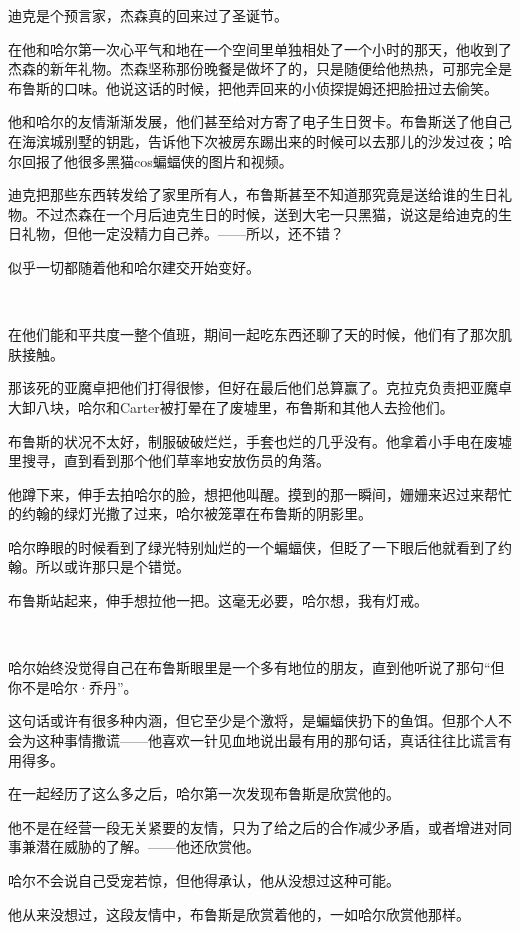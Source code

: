 \documentclass[../main.tex]{subfiles}
\begin{document}
迪克是个预言家，杰森真的回来过了圣诞节。

在他和哈尔第一次心平气和地在一个空间里单独相处了一个小时的那天，他收到了杰森的新年礼物。杰森坚称那份晚餐是做坏了的，只是随便给他热热，可那完全是布鲁斯的口味。他说这话的时候，把他弄回来的小侦探提姆还把脸扭过去偷笑。

他和哈尔的友情渐渐发展，他们甚至给对方寄了电子生日贺卡。布鲁斯送了他自己在海滨城别墅的钥匙，告诉他下次被房东踢出来的时候可以去那儿的沙发过夜；哈尔回报了他很多黑猫cos蝙蝠侠的图片和视频。

迪克把那些东西转发给了家里所有人，布鲁斯甚至不知道那究竟是送给谁的生日礼物。不过杰森在一个月后迪克生日的时候，送到大宅一只黑猫，说这是给迪克的生日礼物，但他一定没精力自己养。——所以，还不错？

似乎一切都随着他和哈尔建交开始变好。

~\

在他们能和平共度一整个值班，期间一起吃东西还聊了天的时候，他们有了那次肌肤接触。

那该死的亚魔卓把他们打得很惨，但好在最后他们总算赢了。克拉克负责把亚魔卓大卸八块，哈尔和Carter被打晕在了废墟里，布鲁斯和其他人去捡他们。

布鲁斯的状况不太好，制服破破烂烂，手套也烂的几乎没有。他拿着小手电在废墟里搜寻，直到看到那个他们草率地安放伤员的角落。

他蹲下来，伸手去拍哈尔的脸，想把他叫醒。摸到的那一瞬间，姗姗来迟过来帮忙的约翰的绿灯光撒了过来，哈尔被笼罩在布鲁斯的阴影里。

哈尔睁眼的时候看到了绿光特别灿烂的一个蝙蝠侠，但眨了一下眼后他就看到了约翰。所以或许那只是个错觉。

布鲁斯站起来，伸手想拉他一把。这毫无必要，哈尔想，我有灯戒。

~\

哈尔始终没觉得自己在布鲁斯眼里是一个多有地位的朋友，直到他听说了那句“但你不是哈尔·乔丹”。

这句话或许有很多种内涵，但它至少是个激将，是蝙蝠侠扔下的鱼饵。但那个人不会为这种事情撒谎——他喜欢一针见血地说出最有用的那句话，真话往往比谎言有用得多。

在一起经历了这么多之后，哈尔第一次发现布鲁斯是欣赏他的。

他不是在经营一段无关紧要的友情，只为了给之后的合作减少矛盾，或者增进对同事兼潜在威胁的了解。——他还欣赏他。

哈尔不会说自己受宠若惊，但他得承认，他从没想过这种可能。

他从来没想过，这段友情中，布鲁斯是欣赏着他的，一如哈尔欣赏他那样。
\end{document}
